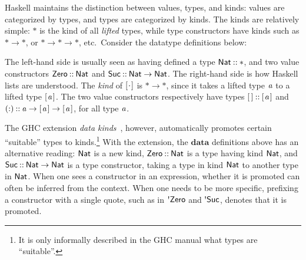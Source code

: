 Haskell maintains the distinction between values, types, and kinds: values are
categorized by types, and types are categorized by kinds. The kinds are
relatively simple: \ensuremath{\mathbin{*}} is the kind of all {\em lifted} types, while type
constructors have kinds such as \ensuremath{\mathbin{*}\to \mathbin{*}}, or \ensuremath{\mathbin{*}\to \mathbin{*}\to \mathbin{*}}, etc.\footnotemark\,
Consider the datatype definitions below:
\resethooks
The left-hand side is usually seen as having defined a type \ensuremath{\Conid{Nat}\mathbin{::}\mathbin{*}},
and two value constructors \ensuremath{\Conid{Zero}\mathbin{::}\Conid{Nat}} and \ensuremath{\Conid{Suc}\mathbin{::}\Conid{Nat}\to \Conid{Nat}}. The right-hand
side is how Haskell lists are understood. The {\em kind} of \ensuremath{[\mskip1.5mu \mathbin{\cdot}\mskip1.5mu]} is \ensuremath{\mathbin{*}\to \mathbin{*}},
since it takes a lifted type \ensuremath{\Varid{a}} to a lifted type \ensuremath{[\mskip1.5mu \Varid{a}\mskip1.5mu]}. The two value
constructors respectively have types \ensuremath{[\mskip1.5mu \mskip1.5mu]\mathbin{::}[\mskip1.5mu \Varid{a}\mskip1.5mu]} and \ensuremath{(\mathbin{:})\mathbin{::}\Varid{a}\to [\mskip1.5mu \Varid{a}\mskip1.5mu]\to [\mskip1.5mu \Varid{a}\mskip1.5mu]}, for all type \ensuremath{\Varid{a}}.


The GHC extension \emph{data kinds}~\cite{promotion}, however, automatically
promotes certain ``suitable'' types to kinds.\footnote{It is only informally
described in the GHC manual what types are ``suitable''.} With the extension,
the \ensuremath{\mathbf{data}} definitions above has an alternative reading: \ensuremath{\Conid{Nat}} is a new kind,
\ensuremath{\Conid{Zero}\mathbin{::}\Conid{Nat}} is a type having kind \ensuremath{\Conid{Nat}}, and \ensuremath{\Conid{Suc}\mathbin{::}\Conid{Nat}\to \Conid{Nat}} is a type
constructor, taking a type in kind \ensuremath{\Conid{Nat}} to another type in \ensuremath{\Conid{Nat}}. When one
sees a constructor in an expression, whether it is promoted can often be
inferred from the context. When one needs to be more specific, prefixing a
constructor with a single quote, such as in \ensuremath{\mbox{\textquotesingle}\Conid{Zero}} and \ensuremath{\mbox{\textquotesingle}\Conid{Suc}}, denotes that it
is promoted.

